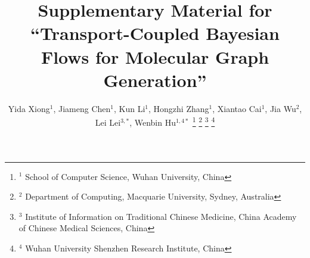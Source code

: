 \documentclass[journal,twoside,web]{ieeecolor}
\begin{document}
\title{Supplementary Material for ``Transport-Coupled Bayesian Flows for Molecular Graph Generation''}

\author{
    Yida Xiong$^1$, Jiameng Chen$^1$, Kun Li$^1$, Hongzhi Zhang$^1$, Xiantao Cai$^1$, Jia Wu$^2$, Lei Lei$^{3,\ast}$, Wenbin Hu$^{1,4\ast}$
    \thanks{$^1$ School of Computer Science, Wuhan University, China}
    \thanks{$^2$ Department of Computing, Macquarie University, Sydney, Australia}
    \thanks{$^3$ Institute of Information on Traditional Chinese Medicine, China Academy of Chinese Medical Sciences, China}
    \thanks{$^4$ Wuhan University Shenzhen Research Institute, China}
}


\end{document}
